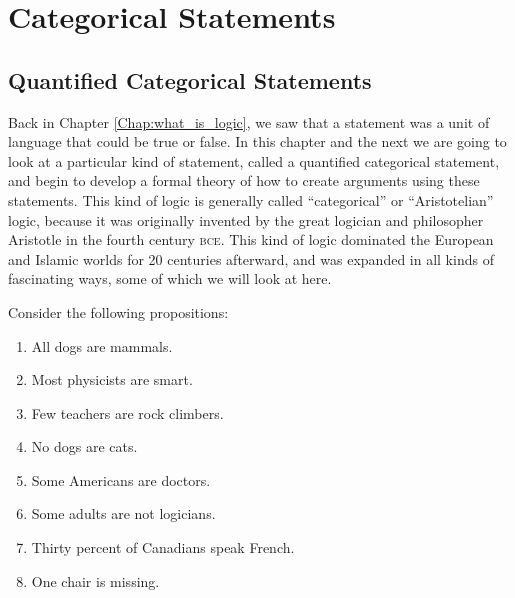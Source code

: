 \chapter{Categorical Statements}
\label{chap:catstatements}
\setlength{\parindent}{1em}


\section{Quantified Categorical Statements}
\label{sec:qcatstatements}

Back in Chapter \ref{Chap:what_is_logic}, we saw that a statement was a unit of language that could be true or false. In this chapter and the next we are going to look at a particular kind of statement, called a quantified categorical statement, and begin to develop a formal theory of how to create arguments using these statements. This kind of logic is generally called ``categorical'' or ``Aristotelian'' logic, because it was originally invented by the great logician and philosopher Aristotle in the fourth century \textsc{bce}. This kind of logic dominated the European and Islamic worlds for 20 centuries afterward, and was expanded in all kinds of fascinating ways, some of which we will look at here.

Consider the following propositions:

\begin{enumerate}[label=(\alph*)]
\item \label{itm:dogs} All dogs are mammals.

\item \label{itm:physicists} Most physicists are smart.

\item \label{itm:teachers} Few teachers are rock climbers.

\item \label{itm:no_dogs} No dogs are cats.

\item \label{itm:americans} Some Americans are doctors.

\item \label{itm:adults}Some adults are not logicians.

\item \label{itm:canadians} Thirty percent of Canadians speak French.

\item \label{itm:chair}One chair is missing.

\end{enumerate}


